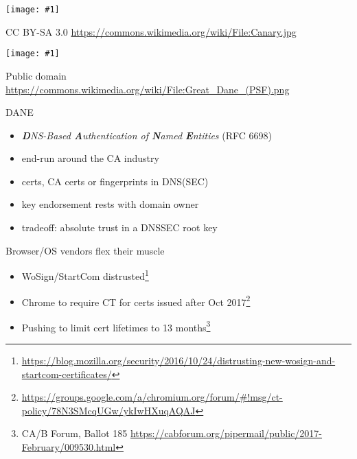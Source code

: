 \documentclass[ignorenonframetext,aspectratio=169]{beamer}
\makeatletter
\def\maxwidth{\ifdim\Gin@nat@width>\linewidth\linewidth\else\Gin@nat@width\fi}
\def\maxheight{\ifdim\Gin@nat@height>\textheight0.8\textheight\else\Gin@nat@height\fi}
\newcommand{\includegraphicsscaled}[1]{
    \texttt{[image: \#1]}
}
\makeatother
\begin{document}
\begin{frame}[plain]

\begin{center}
\includegraphicsscaled{Canary.jpg}
\end{center}

\tiny

CC BY-SA 3.0 \url{https://commons.wikimedia.org/wiki/File:Canary.jpg}

\end{frame}

\begin{frame}[plain]

\begin{center}
\includegraphicsscaled{Great_Dane_(PSF).png}
\end{center}

\tiny

Public domain \url{https://commons.wikimedia.org/wiki/File:Great_Dane_(PSF).png}

\end{frame}

\begin{frame}{DANE}

\begin{itemize}
\item
    \emph{\textbf{D}NS-Based \textbf{A}uthentication of
        \textbf{N}amed \textbf{E}ntities} (RFC 6698)
\item
  end-run around the CA industry
\item
  certs, CA certs or fingerprints in DNS(SEC)
\item
  key endorsement rests with domain owner
\item
  tradeoff: absolute trust in a DNSSEC root key
\end{itemize}

\end{frame}

\begin{frame}{Browser/OS vendors flex their muscle}

\begin{itemize}
\item WoSign/StartCom distrusted\footnote[frame]{
  \url{https://blog.mozilla.org/security/2016/10/24/distrusting-new-wosign-and-startcom-certificates/}}
\item Chrome to require CT for certs issued after Oct 2017\footnote[frame]{
  \url{https://groups.google.com/a/chromium.org/forum/\#!msg/ct-policy/78N3SMcqUGw/ykIwHXuqAQAJ}}
\item Pushing to limit cert lifetimes to 13 months\footnote{
  CA/B Forum, Ballot 185
  \url{https://cabforum.org/pipermail/public/2017-February/009530.html}}
\end{itemize}

\end{frame}
\end{document}
